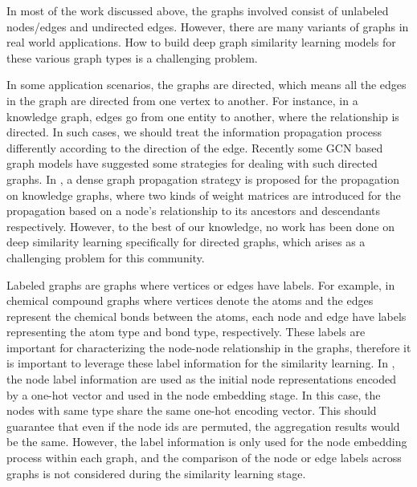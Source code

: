 \label{sec:challenges}

In most of the work discussed above, the graphs involved consist of unlabeled nodes/edges and undirected edges. However, there are many variants of graphs in real world applications. How to build deep graph similarity learning models for these various graph types is a challenging problem. 
\noindent

In some application scenarios, the graphs are directed, which means all the edges in the graph are directed from one vertex to another. For instance, in a knowledge graph, edges go from one entity to another, where the relationship is directed. In such cases, we should treat the information propagation process differently according to the direction of the edge. Recently some GCN based graph models have suggested some strategies for dealing with such directed graphs. In , a dense graph propagation strategy is proposed for the propagation on knowledge graphs, where two kinds of weight matrices are introduced for the propagation based on a node's relationship to its ancestors and descendants respectively. However, to the best of our knowledge, no work has been done on deep similarity learning specifically for directed graphs, which arises as a challenging problem for this community.
\noindent

Labeled graphs are graphs where vertices or edges have labels. For example, in chemical compound graphs where vertices denote the atoms and the edges represent the chemical bonds between the atoms, each node and edge have labels representing the atom type and bond type, respectively. These labels are important for characterizing the node-node relationship in the graphs, therefore it is important to leverage these label information for the similarity learning. In , the node label information are used as the initial node representations encoded by a one-hot vector and used in the node embedding stage. In this case, the nodes with same type share the same one-hot encoding vector. This should guarantee that even if the node ids are permuted, the aggregation results would be the same. However, the label information is only used for the node embedding process within each graph, and the comparison of the node or edge labels across graphs is not considered during the similarity learning stage.   
\noindent

